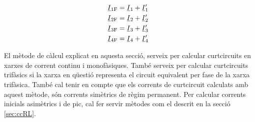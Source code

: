\begin{subequations}
\begin{align}
	\cmplx{I}\ped{1F} &= \cmplx{I}_1 + \cmplx{I}_1' \\
	\cmplx{I}\ped{2F} &= \cmplx{I}_2 + \cmplx{I}_2' \\
	\cmplx{I}\ped{3F} &= \cmplx{I}_3 + \cmplx{I}_3' \\
	\cmplx{I}\ped{4F} &= \cmplx{I}_4 + \cmplx{I}_4' 
\end{align}
\end{subequations}
	
El mètode de càlcul explicat en aquesta secció, serveix per calcular curtcircuits en xarxes de corrent continu i monofàsiques. També serveix per calcular curtcircuits trifàsics si la xarxa en qüestió representa el circuit equivalent per fase de la xarxa trifàsica. També cal tenir en compte que els corrents de curtcircuit calculats amb aquest mètode, són corrents simètrics de règim permanent. Per calcular corrents inicials asimètrics i de pic, cal fer servir mètodes com el descrit en la secció \vref{sec:ccRL}.

